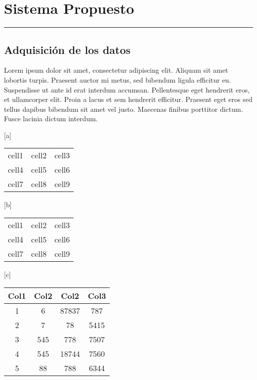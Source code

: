 \chapter{Sistema Propuesto}\label{capit:cap3}
\vspace{-2.0325ex}%
\noindent
\rule{\textwidth}{0.5pt}
\vspace{-5.5ex}%
\newcommand{\pushline}{\Indp}%

\section{Adquisición de los datos}
Lorem ipsum dolor sit amet, consectetur adipiscing elit. Aliquam sit amet lobortis turpis. Praesent auctor mi metus, sed bibendum ligula efficitur eu. Suspendisse ut ante id erat interdum accumsan. Pellentesque eget hendrerit eros, et ullamcorper elit. Proin a lacus et sem hendrerit efficitur. Praesent eget eros sed tellus dapibus bibendum sit amet vel justo. Maecenas finibus porttitor dictum. Fusce lacinia dictum interdum.

\begin{center}[a]
\begin{tabular}{ c c c }
 cell1 & cell2 & cell3 \\ 
 cell4 & cell5 & cell6 \\  
 cell7 & cell8 & cell9    
\end{tabular}
\end{center}

\begin{center}[b]
\begin{tabular}{ |c|c|c| } 
 \hline
 cell1 & cell2 & cell3 \\ 
 cell4 & cell5 & cell6 \\ 
 cell7 & cell8 & cell9 \\ 
 \hline
\end{tabular}
\end{center}

\begin{center}[c]
 \begin{tabular}{||c c c c||} 
 \hline
 Col1 & Col2 & Col2 & Col3 \\ [0.5ex] 
 \hline\hline
 1 & 6 & 87837 & 787 \\ 
 \hline
 2 & 7 & 78 & 5415 \\
 \hline
 3 & 545 & 778 & 7507 \\
 \hline
 4 & 545 & 18744 & 7560 \\
 \hline
 5 & 88 & 788 & 6344 \\ [1ex] 
 \hline
\end{tabular}
\end{center}

